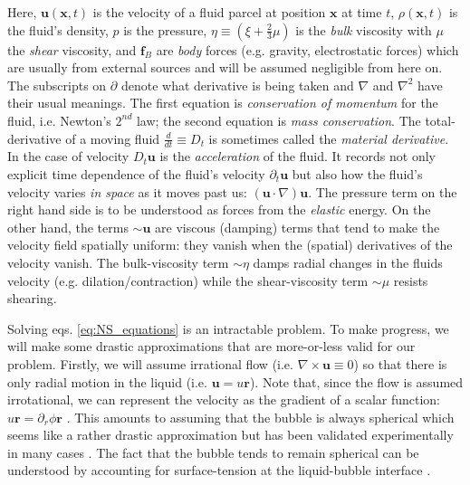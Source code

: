 \documentclass[rmp,aps,nofootinbib,superscriptaddress,floatfix]{revtex4-2}
\begin{document}
Here, $\bm{u}(\bm{x},t)$ is the velocity of a fluid parcel at position $\bm{x}$ at time $t$, $\rho (\bm{x},t)$ is the fluid's density, $p$ is the pressure, $\eta \equiv \left(\xi + \frac{2}{3}\mu \right)$ is the \emph{bulk} viscosity with $\mu$ the \emph{shear} viscosity, and $\bm{f}_B$ are \emph{body} forces (e.g. gravity, electrostatic forces) which are usually from external sources and will be assumed negligible from here on. The subscripts on $\partial$ denote what derivative is being taken and $\nabla$ and $\nabla^2$ have their usual meanings. The first equation is \emph{conservation of momentum} for the fluid, i.e. Newton's $2^{nd}$ law; the second equation is \emph{mass conservation}. The total-derivative of a moving fluid $\frac{d}{dt}\equiv D_t$ is sometimes called the \emph{material derivative}. In the case of velocity $D_t \bm{u}$ is the \emph{acceleration} of the fluid. It records not only explicit time dependence of the fluid's velocity $\partial_t \bm{u}$ but also how the fluid's velocity varies \emph{in space} as it moves past us: $\left( \bm{u}\cdot\nabla \right) \bm{u}$. The pressure term on the right hand side is to be understood as forces from the \emph{elastic} energy. On the other hand, the terms $\sim \bm{u}$ are viscous (damping) terms that tend to make the velocity field spatially uniform: they vanish when the (spatial) derivatives of the velocity vanish. The bulk-viscosity term $\sim \eta$ damps radial changes in the fluids velocity (e.g. dilation/contraction) while the shear-viscosity term $\sim\mu$ resists shearing. 

Solving eqs. \ref{eq:NS_equations} is an intractable problem. To make progress, we will make some drastic approximations that are more-or-less valid for our problem. Firstly, we will assume irrational flow (i.e. $\nabla\times\bm{u}\equiv 0$) so that there is only radial motion in the liquid (i.e. $\bm{u}=u\bm{r}$). Note that, since the flow is assumed irrotational, we can represent the velocity as the gradient of a scalar function: $u\bm{r}=\partial_r \phi \bm{r}$ \cite{jackson1999classical}. This amounts to assuming that the bubble is always spherical which seems like a rather drastic approximation but has been validated experimentally in many cases \cite{}. The fact that the bubble tends to remain spherical can be understood by accounting for surface-tension at the liquid-bubble interface \cite{prosperetti1999old}. 
\end{document}
